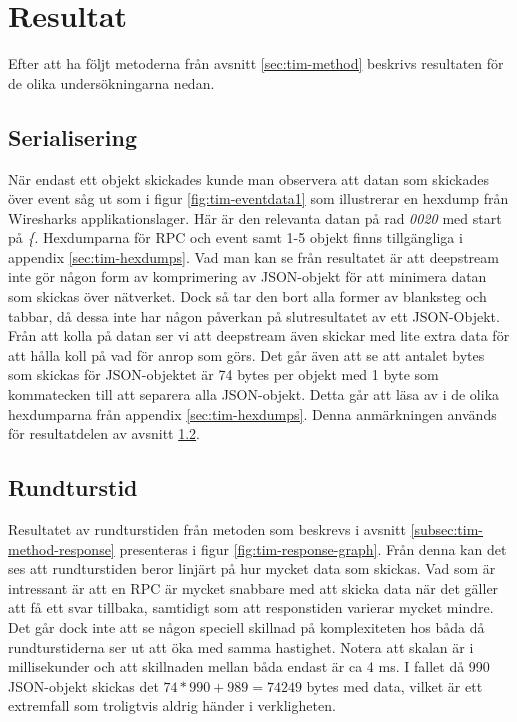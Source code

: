 \section{Resultat}
\label{sec:tim-results}
Efter att ha följt metoderna från avsnitt \ref{sec:tim-method} beskrivs resultaten för de olika undersökningarna nedan. 

\subsection{Serialisering}
När endast ett objekt skickades kunde man observera att datan som skickades över event såg ut som i figur \ref{fig:tim-eventdata1} som illustrerar en hexdump från Wiresharks applikationslager. Här är den relevanta datan på rad \textit{0020} med start på \textit{\{}. Hexdumparna för RPC och event samt 1-5 objekt finns tillgängliga i appendix \ref{sec:tim-hexdumps}. Vad man kan se från resultatet är att deepstream inte gör någon form av komprimering av JSON-objekt för att minimera datan som skickas över nätverket. Dock så tar den bort alla former av blanksteg och tabbar, då dessa inte har någon påverkan på slutresultatet av ett JSON-Objekt. Från att kolla på datan ser vi att deepstream även skickar med lite extra data för att hålla koll på vad för anrop som görs. Det går även att se att antalet bytes som skickas för JSON-objektet är 74 bytes per objekt med 1 byte som kommatecken till att separera alla JSON-objekt. Detta går att läsa av i de olika hexdumparna från appendix \ref{sec:tim-hexdumps}. Denna anmärkningen används för resultatdelen av avsnitt \ref{subsec:tim-result-response}.

\subsection{Rundturstid}
\label{subsec:tim-result-response}
Resultatet av rundturstiden från metoden som beskrevs i avsnitt \ref{subsec:tim-method-response} presenteras i figur \ref{fig:tim-response-graph}. Från denna kan det ses att rundturstiden beror linjärt på hur mycket data som skickas. Vad som är intressant är att en RPC är mycket snabbare med att skicka data när det gäller att få ett svar tillbaka, samtidigt som att responstiden varierar mycket mindre. Det går dock inte att se någon speciell skillnad på komplexiteten hos båda då rundturstiderna ser ut att öka med samma hastighet. Notera att skalan är i millisekunder och att skillnaden mellan båda endast är ca 4 ms. I fallet då 990 JSON-objekt skickas det $74*990+989=74249$ bytes med data, vilket är ett extremfall som troligtvis aldrig händer i verkligheten.

